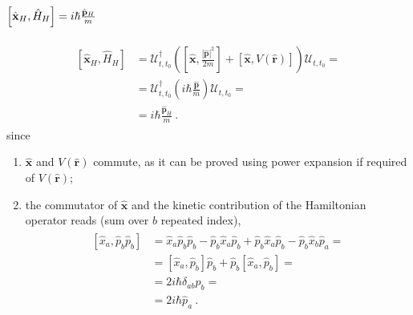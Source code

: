 \documentclass[letterpaper,10pt,english]{jupyterBook}
\begin{document}
\subsubsection*{\protect\(\left[ \hat{\mathbf{x}}_H, \hat{H}_H \right] = i \hbar \frac{\hat{\mathbf{p}}_H}{m}\protect\)}
\begin{equation*}
\begin{split}\begin{aligned}
  \left[ \hat{\mathbf{x}}_H, \hat{H}_H \right] 
  & = \mathscr{U}_{t,t_0}^{\dagger} \left( \left[ \hat{\mathbf{x}}, \frac{\left|\hat{\mathbf{p}}\right|^2}{2m} \right] + \left[ \hat{\mathbf{x}}, V\left(\hat{\mathbf{r}}\right) \right] \right) \mathscr{U}_{t,t_0} = \\
  & = \mathscr{U}_{t,t_0}^{\dagger} \left( i \hbar \frac{\hat{\mathbf{p}}}{m} \right) \mathscr{U}_{t,t_0} = \\
  & = i \hbar \frac{\hat{\mathbf{p}}_H}{m} \ .
\end{aligned}\end{split}
\end{equation*}
\sphinxAtStartPar
since
\begin{enumerate}
%
\item {} 
\sphinxAtStartPar
\(\hat{\mathbf{x}}\) and \(V(\hat{\mathbf{r}})\) commute, as it can be proved using power expansion \sphinxhyphen{} if required \sphinxhyphen{} of \(V(\hat{\mathbf{r}})\);

\item {} 
\sphinxAtStartPar
the commutator of \(\hat{\mathbf{x}}\) and the kinetic contribution of the Hamiltonian operator reads (sum over \(b\) repeated index),
\begin{equation*}
\begin{split}\begin{aligned}
      \left[ \hat{x}_a, \hat{p}_b \hat{p}_b \right] 
      & = \hat{x}_a \hat{p}_b \hat{p}_b - \hat{p}_b \hat{x}_a \hat{p}_b + \hat{p}_b \hat{x}_a \hat{p}_b - \hat{p}_b \hat{x}_b \hat{p}_a = \\
      & = \left[ \hat{x}_a , \hat{p}_b \right] \hat{p}_b + \hat{p}_b \left[ \hat{x}_a , \hat{p}_b \right] = \\
      & = 2 i \hbar \delta_{ab} \hat{p}_b = \\
      & = 2 i \hbar \hat{p}_a \ .
    \end{aligned}\end{split}
\end{equation*}
\end{enumerate}
\end{document}
